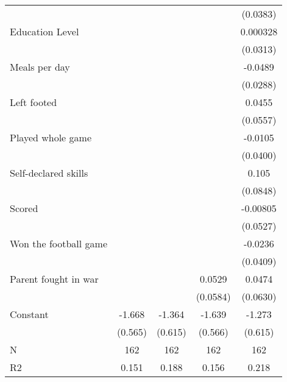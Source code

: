 {\begin{tabular}{l*{4}{c}}
                    &                     &                     &                     &    (0.0383)         \\
[1em]
Education Level     &                     &                     &                     &    0.000328         \\
                    &                     &                     &                     &    (0.0313)         \\
[1em]
Meals per day       &                     &                     &                     &     -0.0489\sym{*}  \\
                    &                     &                     &                     &    (0.0288)         \\
[1em]
Left footed         &                     &                     &                     &      0.0455         \\
                    &                     &                     &                     &    (0.0557)         \\
[1em]
Played whole game   &                     &                     &                     &     -0.0105         \\
                    &                     &                     &                     &    (0.0400)         \\
[1em]
Self-declared skills&                     &                     &                     &       0.105         \\
                    &                     &                     &                     &    (0.0848)         \\
[1em]
Scored              &                     &                     &                     &    -0.00805         \\
                    &                     &                     &                     &    (0.0527)         \\
[1em]
Won the football game&                     &                     &                     &     -0.0236         \\
                    &                     &                     &                     &    (0.0409)         \\
[1em]
Parent fought in war&                     &                     &      0.0529         &      0.0474         \\
                    &                     &                     &    (0.0584)         &    (0.0630)         \\
[1em]
Constant            &      -1.668\sym{***}&      -1.364\sym{**} &      -1.639\sym{***}&      -1.273\sym{**} \\
                    &     (0.565)         &     (0.615)         &     (0.566)         &     (0.615)         \\
\hline
N                   &         162         &         162         &         162         &         162         \\
R2                  &       0.151         &       0.188         &       0.156         &       0.218         \\
\hline\hline
\end{tabular}
}
